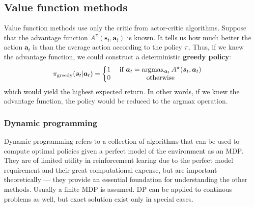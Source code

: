 %
%
%
%
%

\subsection{Value function methods}
Value function methods use only the critic from actor-critic algorithms.
Suppose that the advantage function $ A^{ \pi } (\bm{s}_{t}, \bm{a}_{t} )  $ is known.
It tells us how much better the action $ \bm{a}_{t}  $ is than the average action
according to the policy $ \pi  $.
Thus, if we knew the advantage function, we could construct a deterministic 
\textbf{greedy policy}:
\begin{equation}
		\pi_{ \text{greedy} }(\bm{s}_{t}| \bm{a}_{t}) = \left\{ 
\begin{matrix}
		1 & \text{ if } \bm{a}_t = \arg\!\max_{\bm{a}_t} A^\pi (\bm{s}_{t}, \bm{a}_{t}) 		 \\
		0 & \text{ otherwise}
\end{matrix}
		\right.
\end{equation}
which would yield the highest expected return.
In other words, if we knew the advantage function, the policy would be
reduced to the argmax operation.

\subsubsection{Dynamic programming}
Dynamic programming refers to a collection of algorithms that can be used
to compute optimal policies given a perfect model of the environment as
an MDP.
They are of limited utility in reinforcement learing due to the perfect model requirement 
and their great computational expense, but are important theoretically ---
they provide an essential foundation for understanding the other methods.
Usually a finite MDP is assumed. DP can be applied to continous problems as well,
but exact solution exist only in special cases.

